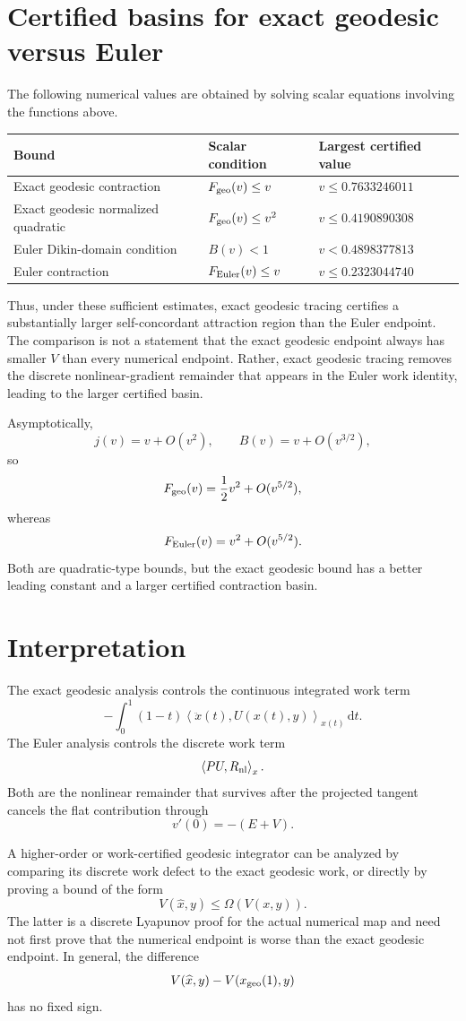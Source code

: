 \documentclass[11pt]{article}
\newcommand{\ip}[2]{\left\langle #1,#2\right\rangle}
\newcommand{\dd}{\mathrm d}
\begin{document}
\section{Certified basins for exact geodesic versus Euler}

The following numerical values are obtained by solving scalar equations involving the functions above.

\begin{center}
\begin{tabular}{lll}
\toprule
Bound & Scalar condition & Largest certified value \\
\midrule
Exact geodesic contraction & $F_{\rm geo}(v)\le v$ & $v\le 0.7633246011$ \\
Exact geodesic normalized quadratic & $F_{\rm geo}(v)\le v^2$ & $v\le 0.4190890308$ \\
Euler Dikin-domain condition & $B(v)<1$ & $v<0.4898377813$ \\
Euler contraction & $F_{\rm Euler}(v)\le v$ & $v\le 0.2323044740$ \\
\bottomrule
\end{tabular}
\end{center}

Thus, under these sufficient estimates, exact geodesic tracing certifies a substantially larger self-concordant attraction region than the Euler endpoint. The comparison is not a statement that the exact geodesic endpoint always has smaller $V$ than every numerical endpoint. Rather, exact geodesic tracing removes the discrete nonlinear-gradient remainder that appears in the Euler work identity, leading to the larger certified basin.

Asymptotically,
\[
    j(v)=v+O(v^2),
    \qquad
    B(v)=v+O(v^{3/2}),
\]
so
\[
    F_{\rm geo}(v)=\frac12 v^2+O(v^{5/2}),
\]
whereas
\[
    F_{\rm Euler}(v)=v^2+O(v^{5/2}).
\]
Both are quadratic-type bounds, but the exact geodesic bound has a better leading constant and a larger certified contraction basin.

\section{Interpretation}

The exact geodesic analysis controls the continuous integrated work term
\[
    -\int_0^1(1-t)\ip{\ddot x(t)}{U(x(t),y)}_{x(t)}\,\dd t.
\]
The Euler analysis controls the discrete work term
\[
    \ip{PU}{R_{\rm nl}}_x.
\]
Both are the nonlinear remainder that survives after the projected tangent cancels the flat contribution through
\[
    v'(0)=-(E+V).
\]

A higher-order or work-certified geodesic integrator can be analyzed by comparing its discrete work defect to the exact geodesic work, or directly by proving a bound of the form
\[
    V(\widehat x,y)
    \le
    \Omega(V(x,y)).
\]
The latter is a discrete Lyapunov proof for the actual numerical map and need not first prove that the numerical endpoint is worse than the exact geodesic endpoint. In general, the difference
\[
    V(\widehat x,y)-V(x_{\rm geo}(1),y)
\]
has no fixed sign.
\end{document}
